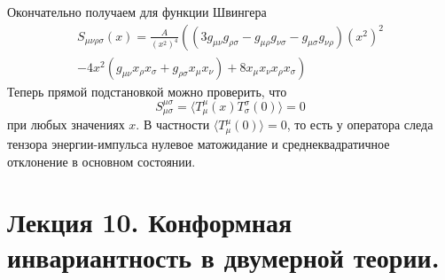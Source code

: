 \documentclass[a4paper,12pt]{article}
\theoremstyle{definition}
\theoremstyle{definition}
\theoremstyle{definition}
\begin{document}
Окончательно получаем для функции Швингера
\begin{multline}
  \label{eq:221}
  S_{\mu\nu\rho\sigma}(x)=\frac{A}{(x^{2})^{4}} \left( (3g_{\mu\nu} g_{\rho\sigma}-g_{\mu\rho}g_{\nu\sigma}-g_{\mu\sigma}g_{\nu\rho}) (x^{2})^{2} 
  \right. \\
  \left.-4 x^{2} (g_{\mu\nu} x_{\rho}x_{\sigma} +g_{\rho\sigma}x_{\mu}x_{\nu}) +8 x_{\mu}x_{\nu}x_{\rho}x_{\sigma}\right)
\end{multline}
Теперь прямой подстановкой можно проверить, что
\begin{equation}
  \label{eq:222}
  S^{\mu\sigma}_{\mu\sigma}=\langle T^{\mu}_{\mu}(x) T^{\sigma}_{\sigma}(0)\rangle=0
\end{equation}
при любых значениях $x$. В частности $\langle T^{\mu}_{\mu}(0)\rangle=0$, то есть у оператора следа тензора энергии-импульса нулевое матожидание и среднеквадратичное отклонение в основном состоянии.

\section{Лекция 10. Конформная инвариантность в двумерной теории.}
\label{sec:lecture-10}
\end{document}
